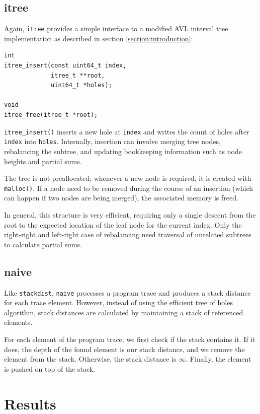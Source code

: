 \documentclass[a4paper,10pt]{article}
\begin{document}
\subsection{itree}

Again, \verb|itree| provides a simple interface to a modified AVL interval tree implementation
as described in section \ref{section:introduction}:

\begin{lstlisting}
int
itree_insert(const uint64_t index,
             itree_t **root,
             uint64_t *holes);

void
itree_free(itree_t *root);
\end{lstlisting}

\lstinline|itree_insert()| inserts a new hole at \lstinline|index| and writes the
count of holes after \lstinline|index| into \lstinline|holes|. Internally, insertion
can involve merging tree nodes, rebalancing the subtree, and updating bookkeeping information
such as node heights and partial sums.

The tree is not preallocated; whenever a new node is required, it is created with \lstinline|malloc()|.
If a node need to be removed during the course of an insertion (which can happen if two nodes are being
merged), the associated memory is freed.

In general, this structure is very efficient, requiring only a single descent from
the root to the expected location of the leaf node for the current index. Only
the right-right and left-right case of rebalancing need traversal of unrelated subtrees
to calculate partial sums.

\subsection{naive}

Like \verb|stackdist|, \verb|naive| processes a program trace and produces
a stack distance for each trace element. However, instead of using the efficient
tree of holes algorithm, stack distances are calculated by maintaining a stack
of referenced elements.

For each element of the program trace, we first check if the stack contains it.
If it does, the depth of the found element is our stack distance, and we remove
the element from the stack. Otherwise, the stack distance is $\infty$. Finally,
the element is pushed on top of the stack.

\section{Results}
\end{document}

